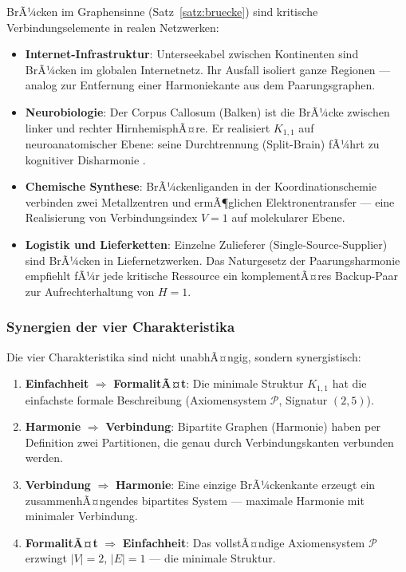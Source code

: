 ﻿\documentclass[a4paper,12pt]{article}
\theoremstyle{definition}
\begin{document}
BrÃ¼cken im Graphensinne (Satz~\ref{satz:bruecke}) sind kritische Verbindungselemente
in realen Netzwerken:
\begin{itemize}
	\item \textbf{Internet-Infrastruktur}: Unterseekabel zwischen Kontinenten sind
	BrÃ¼cken im globalen Internetnetz. Ihr Ausfall isoliert ganze Regionen ---
	analog zur Entfernung einer Harmoniekante aus dem Paarungsgraphen.
	\item \textbf{Neurobiologie}: Der Corpus Callosum (Balken) ist die BrÃ¼cke
	zwischen linker und rechter HirnhemisphÃ¤re. Er realisiert $K_{1,1}$ auf
	neuroanatomischer Ebene: seine Durchtrennung (Split-Brain) fÃ¼hrt zu kognitiver
	Disharmonie \cite{weyl1952}.
	\item \textbf{Chemische Synthese}: BrÃ¼ckenliganden in der Koordinationschemie
	verbinden zwei Metallzentren und ermÃ¶glichen Elektronentransfer --- eine
	Realisierung von Verbindungsindex $V = 1$ auf molekularer Ebene.
	\item \textbf{Logistik und Lieferketten}: Einzelne Zulieferer (Single-Source-Supplier)
	sind BrÃ¼cken in Liefernetzwerken. Das Naturgesetz der Paarungsharmonie empfiehlt
	fÃ¼r jede kritische Ressource ein komplementÃ¤res Backup-Paar zur Aufrechterhaltung
	von $H = 1$.
\end{itemize}

\subsubsection*{Synergien der vier Charakteristika}

Die vier Charakteristika sind nicht unabhÃ¤ngig, sondern synergistisch:
\begin{enumerate}
	\item \textbf{Einfachheit} $\Rightarrow$ \textbf{FormalitÃ¤t}: Die minimale
	Struktur $K_{1,1}$ hat die einfachste formale Beschreibung (Axiomensystem $\mathcal{P}$,
	Signatur $(2,5)$).
	\item \textbf{Harmonie} $\Rightarrow$ \textbf{Verbindung}: Bipartite Graphen
	(Harmonie) haben per Definition zwei Partitionen, die genau durch Verbindungskanten
	verbunden werden.
	\item \textbf{Verbindung} $\Rightarrow$ \textbf{Harmonie}: Eine einzige BrÃ¼ckenkante
	erzeugt ein zusammenhÃ¤ngendes bipartites System --- maximale Harmonie mit
	minimaler Verbindung.
	\item \textbf{FormalitÃ¤t} $\Rightarrow$ \textbf{Einfachheit}: Das vollstÃ¤ndige
	Axiomensystem $\mathcal{P}$ erzwingt $|V| = 2$, $|E| = 1$ --- die minimale
	Struktur.
\end{enumerate}
\end{document}
